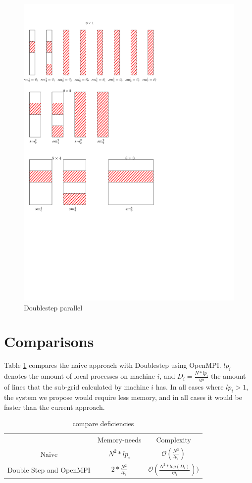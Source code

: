 \documentclass[12pt]{article}
\begin{document}
\begin{figure}
\includegraphics[scale=0.7]{Doublestep_perpendicular}
\caption{Doublestep parallel}
\label{fig:DSperpendicular}
\end{figure}

\section{ Comparisons }

Table \ref{table:comp} compares the naive approach with Doublestep using OpenMPI. $lp_i$ denotes the amount of local processes on machine $i$, and $D_i=\frac{N*lp_i}{gp}$ the amount of lines that the sub-grid calculated by machine $i$ has. In all cases where $lp_i>1$, the system we propose would require less memory, and in all cases it would be faster than the current approach.

\begin{table}
\label{table:comp}
\begin{tabular}{ |c|c|c| }
 \hline
  & Memory-needs & Complexity \\ 
 Naive & $N^2*lp_i$ & $\mathcal{O}(\frac{N^3}{lp_i})$ \\ 
 Double Step and OpenMPI &  $2*\frac{N^2}{lp_i}$ & $\mathcal{O}(\frac{N^2*log(D_i)}{lp_i}) )$\\ 
 \hline
\end{tabular}
\caption{compare deficiencies}
\end{table}
\end{document}
